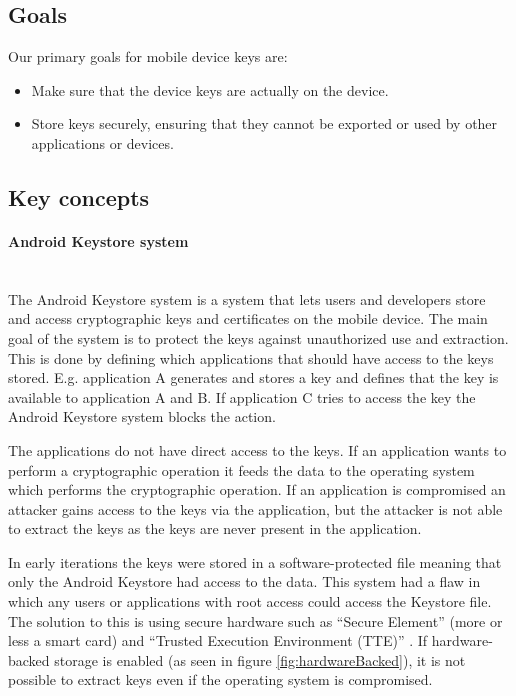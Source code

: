 \subsection{Goals}
Our primary goals for mobile device keys are:

\begin{itemize}
  \item Make sure that the device keys are actually on the device.
  \item Store keys securely, ensuring that they cannot be exported or used by other applications or devices.
\end{itemize}

\subsection{Key concepts}

\paragraph{Android Keystore system}\mbox{}\\
The Android Keystore system is a system that lets users and developers store and access cryptographic keys and certificates on the mobile device. The main goal of the system is to protect the keys against unauthorized use and extraction. This is done by defining which applications that should have access to the keys stored. E.g. application A generates and stores a key and defines that the key is available to application A and B. If application C tries to access the key the Android Keystore system blocks the action.

The applications do not have direct access to the keys. If an application wants to perform a cryptographic operation it feeds the data to the operating system which performs the cryptographic operation. If an application is compromised an attacker gains access to the keys via the application, but the attacker is not able to extract the keys as the keys are never present in the application.

In early iterations the keys were stored in a software-protected file meaning that only the Android Keystore had access to the data. This system had a flaw in which any users or applications with root access could access the Keystore file. The solution to this is using secure hardware such as ``Secure Element'' (more or less a smart card) and ``Trusted Execution Environment (TTE)'' \cite{TEE}. If hardware-backed storage is enabled (as seen in figure \ref{fig:hardwareBacked}), it is not possible to extract keys even if the operating system is compromised.

